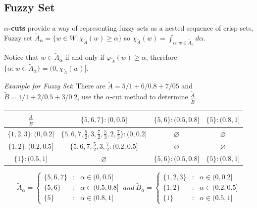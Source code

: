 \documentclass{article}
\begin{document}
\subsection{Fuzzy Set}

\textbf{$\alpha$-cuts} provide a way of representing fuzzy sets as a nested sequence of crisp sets, Fuzzy set $\tilde{A}_{\alpha} = \{ w \in W: \chi_{\tilde{A}}(w) \geq \alpha \}$ so $\chi_{\tilde{A}}(w) = \int_{\alpha:w\in\tilde{A}_{\alpha}}d\alpha$.

Notice that $w \in \tilde{A}_{\alpha}$ if and only if $\varphi_{\tilde{A}}(w) \geq \alpha$, therefore $\{ \alpha: w \in \tilde{A}_{\alpha} \} = (0, \chi_{\tilde{A}}(w)]$.

\textit{Example for Fuzzy Set}: There are $\tilde{A} = 5/1 + 6/0.8 + 7/05$ and $\tilde{B} = 1/1+ 2/0.5 + 3/0.2$, use the $\alpha$-cut method to determine $\frac{\tilde{A}}{\tilde{B}}$.

\begin{table}[h]
    \centering
    \begin{tabular}{|c||c|c|c|}
        \hline
        $\frac{\tilde{A}}{\tilde{B}}$ & $\{5, 6, 7\}:(0, 0.5]$ & $\{5, 6\}:(0.5, 0.8]$ & $\{5\}:(0.8, 1]$\\
        \hline
        \hline
        $\{1, 2, 3\}:(0, 0.2]$ & $\{5,6,7,\frac{5}{2},3,\frac{7}{2},\frac{5}{3},2,\frac{7}{3}\}:(0,0.2]$ & $\varnothing$ & $\varnothing$ \\
        \hline
        $\{1, 2\}:(0.2, 0.5]$ & $\{5,6,7,\frac{5}{2},3,\frac{7}{2}:(0.2,0.5]$ & $\varnothing$ & $\varnothing$ \\
        \hline
        $\{1\}:(0.5, 1]$ & $\varnothing$ & $\{5,6\}:(0.5,0.8]$ & $\{5\}:(0.8,1]$ \\
        \hline
    \end{tabular}
    \label{tab:my_label}
\end{table}

$$\tilde{A}_{\alpha} = \left\{\begin{matrix} \{5, 6, 7\} & : & \alpha \in (0, 0.5] \\  \{5, 6 \}  & : & \alpha \in (0.5, 0.8] \\ \{5 \} & : & \alpha \in (0.8, 1] \end{matrix}\right.\ and\ \tilde{B}_{\alpha} = \left\{\begin{matrix} \{1, 2, 3\} & : & \alpha \in (0, 0.2] \\  \{1, 2 \}  & : & \alpha \in (0.2, 0.5] \\  \{1 \} & : & \alpha \in (0.5, 1] \end{matrix}\right. $$
\end{document}
